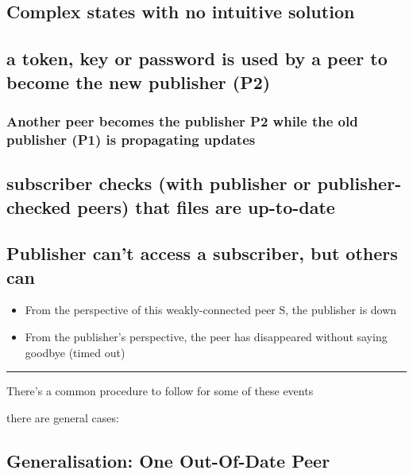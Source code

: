 \documentclass[12pt,a4paper,]{book}
\begin{document}
\subsection{Complex states with no intuitive
solution}\label{complex-states-with-no-intuitive-solution}

\subsection{a token, key or password is used by a peer to become the new
publisher
(P2)}\label{a-token-key-or-password-is-used-by-a-peer-to-become-the-new-publisher-p2}

\subsubsection{Another peer becomes the publisher P2 while the old
publisher (P1) is propagating
updates}\label{another-peer-becomes-the-publisher-p2-while-the-old-publisher-p1-is-propagating-updates}

\subsection{subscriber checks (with publisher or publisher-checked
peers) that files are
up-to-date}\label{subscriber-checks-with-publisher-or-publisher-checked-peers-that-files-are-up-to-date}

\subsection{Publisher can't access a subscriber, but others
can}\label{publisher-cant-access-a-subscriber-but-others-can}

\begin{itemize}
\itemsep1pt\parskip0pt
\item
  From the perspective of this weakly-connected peer S, the publisher is
  down
\item
  From the publisher's perspective, the peer has disappeared without
  saying goodbye (timed out)
\end{itemize}

\begin{center}\rule{3in}{0.4pt}\end{center}

There's a common procedure to follow for some of these events

there are general cases:

\subsection{Generalisation: One Out-Of-Date
Peer}\label{generalisation-one-out-of-date-peer}
\end{document}

